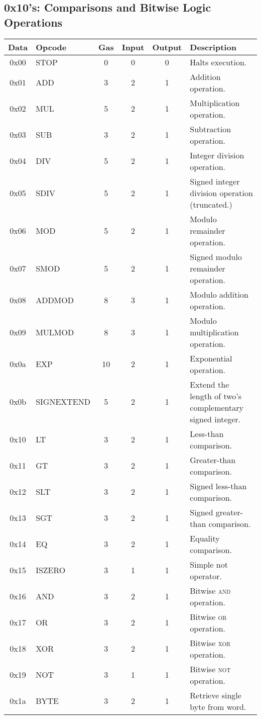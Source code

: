 \documentclass[10pt,letterpaper,leqno,bibliography=totoc]{scrartcl}
\newenvironment{alphafootnotes}
{\par\edef\savedfootnotenumber{\number\value{footnote}}
\renewcommand{\thefootnote}{\alph{footnote}}
\setcounter{footnote}{0}}
{\par\setcounter{footnote}{\savedfootnotenumber}}
\begin{document}
\begin{alphafootnotes}
		\subsection{0x10's: Comparisons and Bitwise Logic Operations}
			\begin{longtable}{|cP{2.8cm}cccp{6cm}|}
			\hline
			\textbf{Data} & \textbf{Opcode} & \textbf{Gas} & \textbf{Input} & \textbf{Output} & \textbf{Description} \\
			\hline
			0x00 & STOP & 0 & 0 & 0 & Halts execution. \\
			0x01 & ADD & 3 & 2 & 1 & Addition operation. \\
			0x02 & MUL & 5 & 2 & 1 & Multiplication operation. \\
			0x03 & SUB & 3 & 2 & 1 & Subtraction operation. \\
			0x04 & DIV & 5 & 2 & 1 & Integer division operation. \\
			0x05 & SDIV & 5 & 2 & 1 & Signed integer division operation (truncated.)\\
			0x06 & MOD & 5 & 2 & 1 & Modulo remainder operation. \\
			0x07 & SMOD & 5 & 2 & 1 & Signed modulo remainder operation. \\
			0x08 & ADDMOD & 8 & 3 & 1 & Modulo addition operation. \\
			0x09 & MULMOD & 8 & 3 & 1 & Modulo multiplication operation. \\
			0x0a & EXP & 10 & 2 & 1 & Exponential operation. \\
			0x0b & SIGNEXTEND & 5  & 2 & 1 & Extend the length of two's complementary signed integer. \\
			0x10 & LT & 3 & 2 & 1 & Less-than comparison. \\
			0x11 & GT & 3 & 2 & 1 & Greater-than comparison. \\
			0x12 & SLT & 3 & 2 & 1 & Signed less-than comparison. \\
			0x13 & SGT & 3 & 2 & 1 & Signed greater-than comparison. \\
			0x14 & EQ & 3 & 2 & 1 & Equality comparison. \\
			0x15 & ISZERO & 3 & 1 & 1 & Simple not operator. \\
			0x16 & AND & 3 & 2 & 1 & Bitwise \textsc{and} operation. \\
			0x17 & OR & 3 & 2 & 1 & Bitwise \textsc{or} operation. \\
			0x18 & XOR & 3 & 2 & 1 & Bitwise \textsc{xor} operation. \\
			0x19 & NOT & 3 & 1 & 1 & Bitwise \textsc{not} operation. \\
			0x1a & BYTE & 3 & 2 & 1 & Retrieve single byte from word. \\
			\hline
			\end{longtable}


\end{alphafootnotes}
\end{document}
